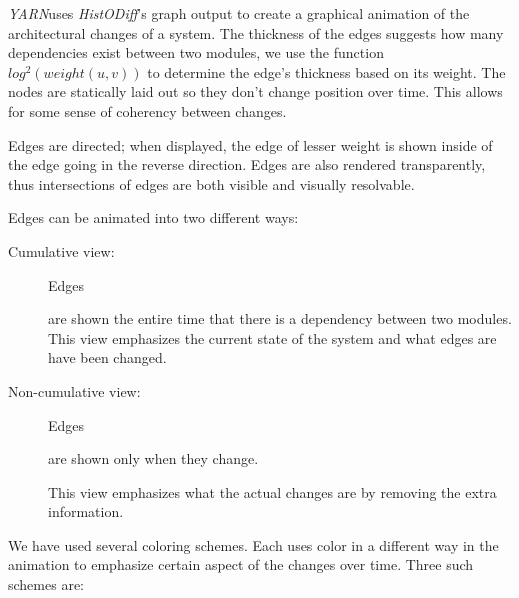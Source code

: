 \documentclass[times, 10pt,twocolumn]{article}
\newcommand{\histodiff}{\emph{HistODiff}\xspace}
\newcommand{\yarn}{\emph{YARN\xspace}}
\begin{document}


\yarn uses \histodiff's graph output to create a graphical animation of the
architectural changes of a system.  
The thickness of the edges suggests how many dependencies exist between two
modules, we use the function $log^2(weight(u,v))$ to determine the edge's
thickness based on its weight.  The nodes are statically laid out so they
don't change position over time.  This allows for some sense of coherency
between changes.


Edges are directed; when displayed, the edge of lesser weight is shown
inside of the edge going in the reverse direction.  Edges are also rendered
transparently, thus intersections of edges are both visible and visually
resolvable.

Edges can be animated into two different ways:



\begin{description}
\item[Cumulative view:] Edges 


are shown
the entire time that there is a
    dependency between two modules. This view emphasizes the current state
    of the system and what edges are have been changed. 
\item[Non-cumulative view:] Edges 


are shown only when they change.


This view
    emphasizes what the actual changes are by removing the extra
    information.  
\end{description}

We have used several coloring schemes. Each uses color in a different way
in the animation to emphasize certain aspect of the changes over time.
Three such schemes are:
\end{document}
